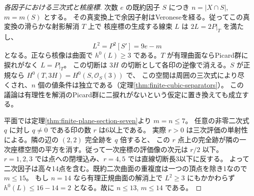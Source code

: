 \begin{proof}[各因子における三次式と核座標]
次数 $e$ の既約因子 $S$ につき $n=|X\cap S|$, $m=m(S)$ とする。
その真変換上で余因子射はVeroneseを経る。従ってこの真変換の滑らかな射影解消 $T$ 上で
核座標の生成する線束 $L$ は $2L=2P|_T$ を満たし、
\[
                  L^2=P^2[S']=9e-m
\]
となる。正なら核像は曲面で $h^0(L)\ge3$ である。$T$ が有理曲面ならPicard群に捩れがなく $L=P|_T$。
この切断は $3H$ の切断として各印の逆像で消える。$S$ が正規なら $H^0(T,3H)=H^0(S,\mathcal O_S(3))$ で、
この空間は周囲の三次式により尽くされ、$n$ 個の値条件は独立である（定理\ref{thm:finite-cubic-separators}）。
この議論は有理性を解消のPicard群に二捩れがないという仮定に置き換えても成立する。

平面では定理\ref{thm:finite-plane-section-seven}より $m=n\le7$。
任意の非零二次式 $q$ に対し $q\ne0$ である印の数 $r$ は6以上である。
実際 $r>0$ は三次評価の単射性による。隣の辺の $(2,2)$ 完全跡を $q$ 倍すると、
この $r$ 点上の完全跡が隣の一次座標空間の平方を消す。従って一次座標の評価像の次元は $r/2$ 以下。
$r=1,2,3$ では点への閉埋込み、$r=4,5$ では直線切断長3以下に反する。
よって二次因子は高々14点を含む。既約二次曲面の重複度は一つの頂点を除き1なので $m\le15$。
もし $n=14$ なら有理正規曲面の解消上で $L^2\ge3$ にもかかわらず
$h^0(L)\le16-14=2$ となる。故に $n\le13$, $m\le14$ である。
\end{proof}
